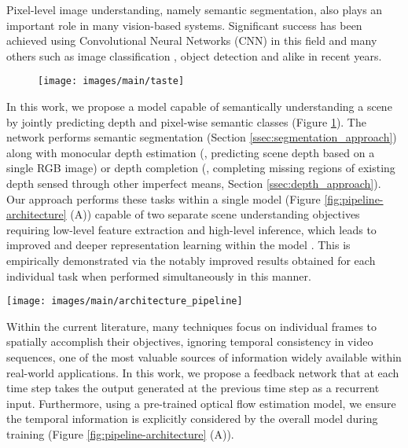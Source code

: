 \documentclass[10pt,twocolumn,letterpaper]{article}
\begin{document}
Pixel-level image understanding, namely semantic segmentation, also plays an important role in many vision-based systems. Significant success has been achieved using Convolutional Neural Networks (CNN) in this field \cite{badrinarayanan2015segnet, chen2018deeplab, long2015fully, ronneberger2015u, stollenga2015parallel} and many others such as image classification \cite{maggiori2017convolutional}, object detection \cite{zhu2017flow} and alike in recent years.\begin{figure}[t!]
	\centering
	\texttt{[image: images/main/taste]}
	\captionsetup[figure]{skip=7pt}
	\label{fig:taste}\vspace{-0.7cm}
\end{figure}


In this work, we propose a model capable of semantically understanding a scene by jointly predicting depth and pixel-wise semantic classes (Figure \ref{fig:taste}). The network performs semantic segmentation (Section \ref{ssec:segmentation_approach}) along with monocular depth estimation (\ie, predicting scene depth based on a single RGB image) or depth completion (\ie, completing missing regions of existing depth sensed through other imperfect means, Section \ref{ssec:depth_approach}). Our approach performs these tasks within a single model (Figure \ref{fig:pipeline-architecture} (A)) capable of two separate scene understanding objectives requiring low-level feature extraction and high-level inference, which leads to improved and deeper representation learning within the model \cite{kendall2018multi}. This is empirically demonstrated via the notably improved results obtained for each individual task when performed simultaneously in this manner.\begin{figure*}[t!]
	\centering
	\texttt{[image: images/main/architecture\_pipeline]}
	\captionsetup[figure]{skip=7pt}
	\label{fig:pipeline-architecture}\vspace{-0.5cm}
\end{figure*}


Within the current literature, many techniques focus on individual frames to spatially accomplish their objectives, ignoring temporal consistency in video sequences, one of the most valuable sources of information widely available within real-world applications. In this work, we propose a feedback network that at each time step takes the output generated at the previous time step as a recurrent input. Furthermore, using a pre-trained optical flow estimation model, we ensure the temporal information is explicitly considered by the overall model during training (Figure \ref{fig:pipeline-architecture} (A)).
\end{document}
